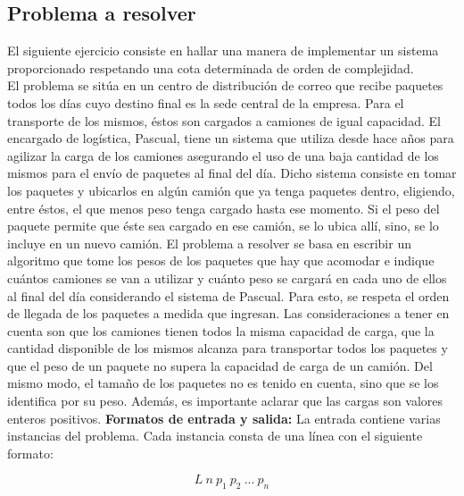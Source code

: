\subsection{Problema a resolver}
El siguiente ejercicio consiste en hallar una manera de implementar un sistema proporcionado respetando una cota determinada de orden de complejidad.\\
\newline
El problema se sitúa en un centro de distribución de correo que recibe paquetes todos los días cuyo destino final es la sede central de la empresa. Para el transporte de los mismos, éstos son cargados a camiones de igual capacidad. El encargado de logística, Pascual, tiene un sistema que utiliza desde hace años para agilizar la carga de los camiones asegurando el uso de una baja cantidad de los mismos para el envío de paquetes al final del día. Dicho sistema consiste en tomar los paquetes y ubicarlos en algún camión que ya tenga paquetes dentro, eligiendo, entre éstos, el que menos peso tenga cargado hasta ese momento. Si el peso del paquete permite que éste sea cargado en ese camión, se lo ubica allí, sino, se lo incluye en un nuevo camión.\newline
\newline
El problema a resolver se basa en escribir un algoritmo que tome los pesos de los paquetes que hay que acomodar e indique cuántos camiones se van a utilizar y cuánto peso se cargará en cada uno de ellos al final del día considerando el sistema de Pascual. Para esto, se respeta el orden de llegada de los paquetes a medida que ingresan. \newline
\newline
Las consideraciones a tener en cuenta son que los camiones tienen todos la misma capacidad de carga, que la cantidad disponible de los mismos alcanza para transportar todos los paquetes y que el peso de un paquete no supera la capacidad de carga de un camión. Del mismo modo, el tamaño de los paquetes no es tenido en cuenta, sino que se los identifica por su peso. Además, es importante aclarar que las cargas son valores enteros positivos.\newline
\newline
\textbf {Formatos de entrada y salida:}\newline
\newline
La entrada contiene varias instancias del problema. Cada instancia consta de una línea con el siguiente formato:

$$L\ n\ p_{1}\ p_{2}\ ...\ p_{n}$$


